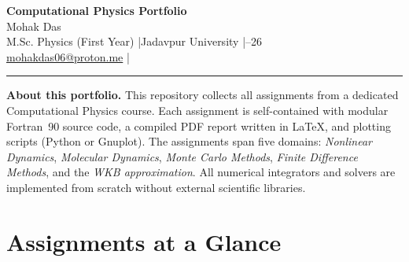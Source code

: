 \documentclass[11pt, a4paper]{article}
\begin{document}

\begin{center}
  {\LARGE\bfseries\color{accent} Computational Physics Portfolio}\\[0.5em]
  {\large Mohak Das}\\[0.2em]
  {\normalsize M.Sc. Physics (First Year) \quad|\quad Jadavpur University \quad|--26}\\[0.2em]
  {\small \href{mailto:mohakdas06@proton.me}{mohakdas06@proton.me}
  \quad|}
\end{center}

\vspace{0.5em}
\textcolor{rulecolor}{\rule{\linewidth}{1pt}}
\vspace{0.8em}

\begin{infobox}
\textbf{About this portfolio.}
This repository collects all assignments from a dedicated Computational Physics
course. Each assignment is self-contained with modular Fortran~90 source code,
a compiled PDF report written in \LaTeX, and plotting scripts (Python or
Gnuplot). The assignments span five domains: \textit{Nonlinear Dynamics}, \textit{Molecular
Dynamics}, \textit{Monte Carlo Methods}, \textit{Finite Difference Methods}, and the \textit{WKB
approximation}. All numerical integrators and solvers are implemented from
scratch without external scientific libraries.
\end{infobox}

\vspace{0.3em}

\section{Assignments at a Glance}
\end{document}
